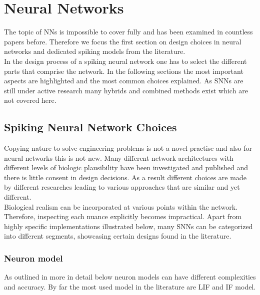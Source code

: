 \section{Neural Networks}
The topic of \acp{NN} is impossible to cover fully and has been examined in countless papers before. Therefore we focus the first section on design choices in neural networks and dedicated spiking models from the literature.\\
In the design process of a spiking neural network one has to select the different parts that comprise the network. In the following sections the most important aspects are highlighted and the most common choices explained. As \acp{SNN} are still under active research many hybrids and combined methods exist which are not covered here.\\
\subsection{Spiking Neural Network Choices}

Copying nature to solve engineering problems is not a novel practise and also for neural networks this is not new. Many different network architectures with different levels of biologic plausibility have been investigated and published and there is little consent in design decisions. As a result different choices are made by different researches leading to various approaches that are similar and yet different.\\
Biological realism can be incorporated at various points within the network. Therefore, inspecting each nuance explicitly becomes impractical. Apart from highly specific implementations illustrated below, many \acp{SNN} can be categorized into different segments, showcasing certain designs found in the literature.\\

\subsubsection{Neuron model}
As outlined in more in detail below neuron models can have different complexities and accuracy. By far the most used model in the literature are \ac{LIF} and \ac{IF} model.\\

